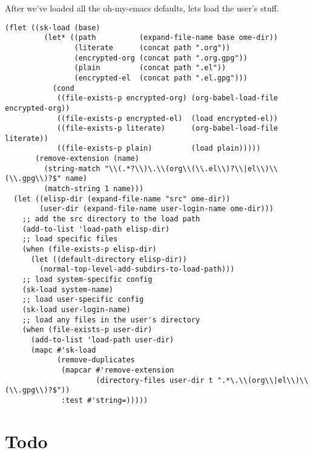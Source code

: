 \documentclass[11pt]{article}
\begin{document}
After we've loaded all the oh-my-emacs defaults, lets load the user's stuff.

\begin{verbatim}
(flet ((sk-load (base)
         (let* ((path          (expand-file-name base ome-dir))
                (literate      (concat path ".org"))
                (encrypted-org (concat path ".org.gpg"))
                (plain         (concat path ".el"))
                (encrypted-el  (concat path ".el.gpg")))
           (cond
            ((file-exists-p encrypted-org) (org-babel-load-file encrypted-org))
            ((file-exists-p encrypted-el)  (load encrypted-el))
            ((file-exists-p literate)      (org-babel-load-file literate))
            ((file-exists-p plain)         (load plain)))))
       (remove-extension (name)
         (string-match "\\(.*?\\)\.\\(org\\(\\.el\\)?\\|el\\)\\(\\.gpg\\)?$" name)
         (match-string 1 name)))
  (let ((elisp-dir (expand-file-name "src" ome-dir))
        (user-dir (expand-file-name user-login-name ome-dir)))
    ;; add the src directory to the load path
    (add-to-list 'load-path elisp-dir)
    ;; load specific files
    (when (file-exists-p elisp-dir)
      (let ((default-directory elisp-dir))
        (normal-top-level-add-subdirs-to-load-path)))
    ;; load system-specific config
    (sk-load system-name)
    ;; load user-specific config
    (sk-load user-login-name)
    ;; load any files in the user's directory
    (when (file-exists-p user-dir)
      (add-to-list 'load-path user-dir)
      (mapc #'sk-load
            (remove-duplicates
             (mapcar #'remove-extension
                     (directory-files user-dir t ".*\.\\(org\\|el\\)\\(\\.gpg\\)?$"))
             :test #'string=)))))
\end{verbatim}

\section*{Todo}
\label{sec-5}
\end{document}
